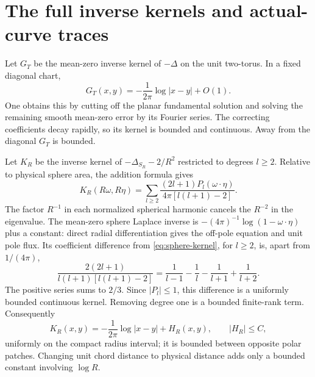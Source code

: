\documentclass[11pt]{article}
\theoremstyle{remark}\newtheorem{remark}[theorem]{Remark}
\numberwithin{equation}{section}
\begin{document}
\section{The full inverse kernels and actual-curve traces}\label{sec:trace}
Let $G_T$ be the mean-zero inverse kernel of $-\Delta$ on the unit
two-torus. In a fixed diagonal chart,
\begin{equation}
 G_T(x,y)=-\frac1{2\pi}\log|x-y|+O(1).\label{eq:torus-kernel}
\end{equation}
One obtains this by cutting off the planar fundamental solution and
solving the remaining smooth mean-zero error by its Fourier series.
The correcting coefficients decay rapidly, so its kernel is bounded and
continuous. Away from the diagonal $G_T$ is bounded.

Let $K_R$ be the inverse kernel of $-\Delta_{S_R}-2/R^2$ restricted
to degrees $l\geq2$. Relative to physical sphere area, the addition
formula gives
\begin{equation}
 K_R(R\omega,R\eta)=\sum_{l\geq2}
 \frac{(2l+1)P_l(\omega\cdot\eta)}{4\pi[l(l+1)-2]}.
 \label{eq:sphere-kernel}
\end{equation}
The factor $R^{-1}$ in each normalized spherical harmonic cancels
the $R^{-2}$ in the eigenvalue. The mean-zero sphere Laplace inverse is
$-(4\pi)^{-1}\log(1-\omega\cdot\eta)$ plus a constant: direct radial
differentiation gives the off-pole equation and unit pole flux.
Its coefficient difference from \eqref{eq:sphere-kernel}, for $l\geq2$,
is, apart from $1/(4\pi)$,
\[
 \frac{2(2l+1)}{l(l+1)[l(l+1)-2]}
 =\frac1{l-1}-\frac1l-\frac1{l+1}+\frac1{l+2}.
\]
The positive series sums to $2/3$. Since $|P_l|\leq1$, this difference
is a uniformly bounded continuous kernel. Removing degree one is a
bounded finite-rank term. Consequently
\begin{equation}
 K_R(x,y)=-\frac1{2\pi}\log|x-y|+H_R(x,y),\qquad |H_R|\leq C,
 \label{eq:jacobi-log}
\end{equation}
uniformly on the compact radius interval; it is bounded between opposite
polar patches. Changing unit chord distance to physical distance adds
only a bounded constant involving $\log R$.
\end{document}
